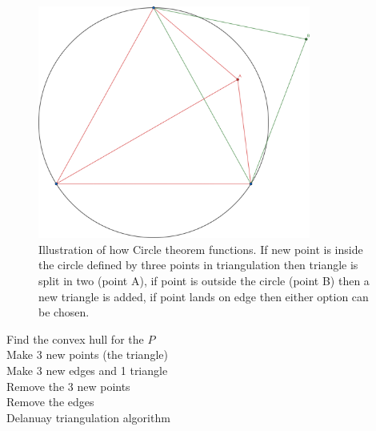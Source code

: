 \documentclass[a4paper,12pt]{extarticle}
\begin{document}
\begin{figure}[H]
  \centering
  \includegraphics[width=0.8\textwidth]{CircleTheorem.png}
  \caption{Illustration of how Circle theorem functions. If new point is inside the circle defined by three points in triangulation then triangle is split in two (point A), if point is outside the circle (point B) then a new triangle is added, if point lands on edge then either option can be chosen.}
  \label{fig:CircleTheorem}
\end{figure}

\begin{algorithm}
  \SetAlgoLined
  Find the convex hull for the $P$\\
  Make 3 new points (the triangle)\\
  Make 3 new edges and 1 triangle\\
  Remove the 3 new points\\
  Remove the edges\\
  \caption{Delanuay triangulation algorithm}
  \label{alg:DelaunayTriangulation}
\end{algorithm}
 
\end{document}
